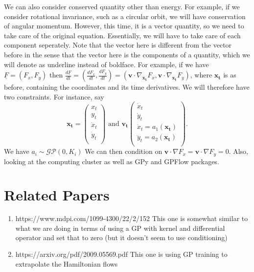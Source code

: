 \documentclass{article}
\begin{document}
We can also consider conserved quantity other than energy.
For example, if we consider rotational invariance, such as a circular orbit, we will have conservation of angular momentum.
However, this time, it is a vector quantity, so we need to take care of the original equation.
Essentially, we will have to take care of each component seperately.
Note that the vector here is different from the vector before in the sense that the vector here is the components of a quantity, which we will denote as underline instead of boldface.
For example, if we have $\underline{F} = (F_x, F_y)$ then $\frac{d\underline{F}}{dt} = (\frac{dF_x}{dt}, \frac{dF_y}{dt}) = (\mathbf{v}\cdot\nabla_{\mathbf{x_t}}F_x, \mathbf{v}\cdot\nabla_{\mathbf{x_t}}F_y)$, where $\mathbf{x_t}$ is as before, containing the coordinates and its time derivatives. 
We will therefore have two constraints.
For instance, say $$\mathbf{x_t} = \begin{pmatrix}
  x_t \\
  y_t \\
  \dot{x}_t\\
  \dot{y}_t\\
\end{pmatrix}
\text{ and } \mathbf{v_t}
\begin{pmatrix}
  \dot{x}_t \\
  \dot{y}_t\\
  \ddot{x}_t= a_1(\mathbf{x_t})\\
  \ddot{y}_t= a_2(\mathbf{x_t})\\
\end{pmatrix}.
$$
We have $a_i\sim\mathcal{GP}(0, K_i)$
We can then condition on $\mathbf{v}\cdot\nabla F_x= \mathbf{v}\cdot\nabla F_y=0.$
Also, looking at the computing cluster as well as GPy and GPFlow packages. 

\section*{Related Papers}
\begin{enumerate}
  \item https://www.mdpi.com/1099-4300/22/2/152 This one is somewhat similar to what we are doing in terms of using a GP with kernel and differential operator and set that to zero (but it doesn't seem to use conditioning)
  \item https://arxiv.org/pdf/2009.05569.pdf This one is using GP training to extrapolate the Hamiltonian flows 
\end{enumerate}
\end{document}

